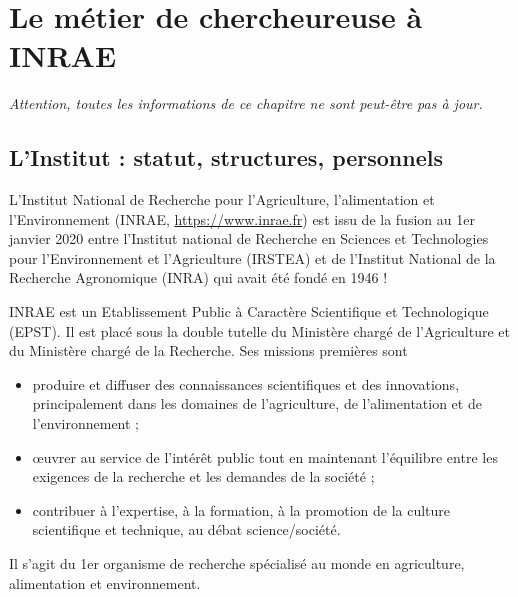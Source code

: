 \chapter{Le m\'etier de chercheur\mp euse \`a INRAE}
\emph{Attention, toutes les informations de ce chapitre ne sont peut-\^etre pas \`a jour.}

\section{L'Institut : statut, structures, personnels}

L'Institut National de Recherche pour l'Agriculture, l'alimentation et l'Environnement (INRAE, \url{https://www.inrae.fr}) est issu de la fusion au 1er janvier 2020 entre l'Institut national de Recherche en Sciences et Technologies pour l'Environnement et l'Agriculture (IRSTEA) et de l’Institut National de la Recherche Agronomique (INRA) qui avait \'et\'e fond\'e en 1946 ! 

INRAE est un Etablissement Public \`a Caract\`ere Scientifique et Technologique (EPST). Il est plac\'e sous la double tutelle du Minist\`ere charg\'e de l'Agriculture et du Minist\`ere charg\'e de la Recherche. Ses missions premi\`eres sont 
\begin{itemize}
\item produire et diffuser des connaissances scientifiques et des innovations, principalement dans les domaines de l'agriculture, de l'alimentation et de l'environnement ;
\item \oe uvrer au service de l'int\'er\^et public tout en maintenant l'\'equilibre entre les exigences de la recherche et les demandes de la soci\'et\'e ;
\item contribuer \`a l'expertise, \`a la formation, \`a la promotion de la culture scientifique et technique, au d\'ebat science/soci\'et\'e.
\end{itemize}
Il s'agit du 1er organisme de recherche sp\'ecialis\'e au monde en agriculture, alimentation et environnement.

